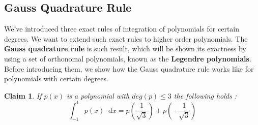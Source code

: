 \documentclass[paper=a4, fontsize=11pt]{scrartcl}
\newcommand*\dif{\mathop{}\!\mathrm{d}}
\newtheorem{claim}{Claim}
\begin{document}
\subsection{Gauss Quadrature Rule}
\vspace{0.15in}

We've introduced three exact rules of integration of polynomials for certain degrees. We want to extend such exact rules to higher order polynomials. The \textbf{Gauss quadrature rule} is such result, which will be shown its exactness by using a set of orthonomal polynomials, known as the \textbf{Legendre polynomials}.\\

Before introducing them, we show how the Gauss quadrature rule works like for polynomials with certain degrees.\\

\begin{claim}
	If $p(x)$ is a polynomial with $deg(p) \leq 3$ the following holds : \\
	
	\begin{equation}\nonumber
		\int_{-1}^{1} p(x) \dif x = p\left( \frac{1}{\sqrt{3}} \right) + p\left(- \frac{1}{\sqrt{3}} \right)
	\end{equation}\\
\end{claim}
\end{document}
